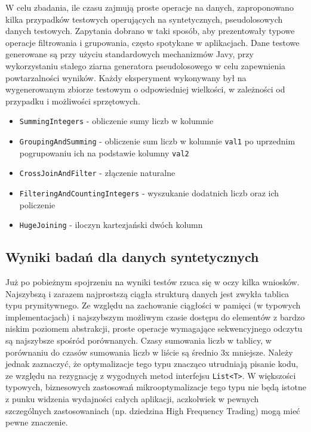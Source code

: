 \documentclass[12pt]{extarticle}
\begin{document}
    W celu zbadania, ile czasu zajmują proste operacje na danych, zaproponowano kilka przypadków testowych operujących na syntetycznych, pseudolosowych danych testowych. Zapytania dobrano w taki sposób, aby prezentowały typowe operacje filtrowania i grupowania, często spotykane w aplikacjach. Dane testowe generowane są przy użyciu standardowych mechanizmów Javy, przy wykorzystaniu stałego ziarna generatora pseudolosowego w celu zapewnienia powtarzalności wyników. Każdy eksperyment wykonywany był na wygenerowanym zbiorze testowym o odpowiedniej wielkości, w zależności od przypadku i możliwości sprzętowych.

\begin{itemize}
    \item \texttt{SummingIntegers} - obliczenie sumy liczb w kolumnie
    \item \texttt{GroupingAndSumming} - obliczenie sum liczb w kolumnie \texttt{val1} po uprzednim pogrupowaniu ich na podstawie kolumny \texttt{val2}
    \item \texttt{CrossJoinAndFilter} - złączenie naturalne
    \item \texttt{FilteringAndCountingIntegers} - wyszukanie dodatnich liczb oraz ich policzenie
    \item \texttt{HugeJoining} - iloczyn kartezjański dwóch kolumn
\end{itemize}


\subsection{Wyniki badań dla danych syntetycznych}

    Już po pobieżnym spojrzeniu na wyniki testów rzuca się w oczy kilka wniosków. Najszybszą i zarazem najprostszą ciągła strukturą danych jest zwykła tablica typu prymitywnego. Ze względu na zachowanie ciągłości w pamięci (w typowych implementacjach) i najszybszym możliwym czasie dostępu do elementów z bardzo niskim poziomem abstrakcji, proste operacje wymagające sekwencyjnego odczytu są najszybsze spośród porównanych. Czasy sumowania liczb w tablicy, w porównaniu do czasów sumowania liczb w liście są średnio 3x mniejsze. Należy jednak zaznaczyć, że optymalizacje tego typu znacząco utrudniają pisanie kodu, ze względu na rezygnację z wygodnych metod interfejsu \texttt{List<T>}. W większości typowych, biznesowych zastosowań mikrooptymalizacje tego typu nie będą istotne z punku widzenia wydajności całych aplikacji, aczkolwiek w pewnych szczególnych zastosowaniach (np. dziedzina High Frequency Trading) mogą mieć pewne znaczenie.
\end{document}
